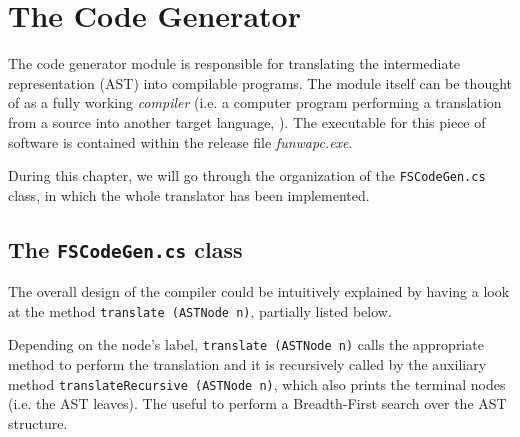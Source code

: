
\chapter{\label{chapter4} The \fsharp Code Generator}

The code generator module is responsible for translating the \fwap intermediate representation (AST) into compilable \fsharp programs. The module itself can be thought of as a fully working \textit{compiler} (i.e. a computer program performing a translation from a source into another target language, \cite{dragon}). The executable for this piece of software is contained within the release file \textit{funwapc.exe}. 

During this chapter, we will go through the organization of the \texttt{FSCodeGen.cs} class, in which the whole translator has been implemented.

\section{The \texttt{FSCodeGen.cs} class}

The overall design of the compiler could be intuitively explained by having a look at the method \texttt{translate (ASTNode n)}, partially listed below. 




Depending on the node's label, \texttt{translate (ASTNode n)} calls the appropriate method to perform the translation and it is recursively called by the auxiliary method \texttt{translateRecursive (ASTNode n)}, which also prints the terminal nodes (i.e. the AST leaves). The  useful to perform a Breadth-First search over the AST structure.


